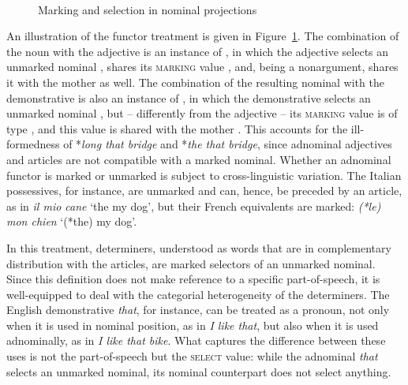 \documentclass[output=paper
	        ,collection
	        ,collectionchapter
 	        ,biblatex
                ,babelshorthands
                ,newtxmath
                ,draftmode
                ,colorlinks, citecolor=brown
]{langscibook}
\begin{document}
\begin{exe}
\ex\label{hein} 
 \impl \\
\end{exe}    

\begin{figure}
\centering
{}
\caption{\label{markyy} Marking and selection in nominal projections}
\end{figure}

An illustration of the functor treatment is given in Figure~\ref{markyy}.
The combination of the noun with the adjective is an instance of , 
in which the adjective selects an unmarked nominal ,  
shares its \textsc{marking} value , and, being a nonargument, 
shares it with the mother as well. 
The combination of the resulting nominal with the demonstrative is also 
an instance of ,
in which the demonstrative selects an unmarked nominal , 
but -- differently from the adjective -- its \textsc{marking} value is of type 
, and this value is shared with the mother .    
This accounts for the ill-formedness of 
*\emph{long that bridge} and *\emph{the that bridge}, since 
adnominal adjectives and articles are not compatible with a marked nominal.  
Whether an adnominal functor is marked or unmarked is subject to cross-linguistic variation. 
The Italian possessives, for instance, are unmarked and can, hence, be preceded 
by an article, as in \emph{il mio cane} `the my dog', but   
their French equivalents are marked: \emph{(*le) mon chien} `(*the) my dog'. 

In this treatment, determiners, understood as words that are in complementary distribution with 
the articles, are marked selectors of an unmarked nominal. Since this definition does not 
make reference to a specific part-of-speech, it is well-equipped to deal with the categorial 
heterogeneity of the determiners. The English demonstrative \emph{that}, for instance, 
can be treated as a pronoun, not only when it is used in nominal position, as in 
\emph{I like that}, but also when it is used adnominally, as in \emph{I like that bike}.   
What captures the difference between these uses is not the part-of-speech but  
the \textsc{select} value: while the adnominal \emph{that} selects an unmarked nominal, 
its nominal counterpart does not select anything.      
\end{document}
